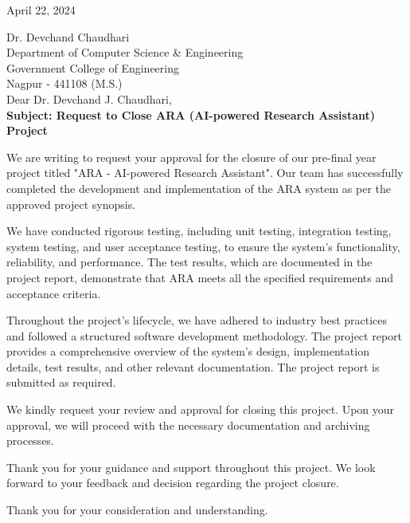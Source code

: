 \documentclass[a4paper]{report}
\date{April 22, 2024}
\begin{document}
\begin{FlushRight}
April 22, 2024
\end{FlushRight}

{Dr. Devchand Chaudhari\\Department of Computer Science \& Engineering\\Government College of Engineering\\Nagpur - 441108 (M.S.)}\\ \bigskip
{Dear Dr. Devchand J. Chaudhari,}\\
\medskip
\textbf{Subject: Request to Close ARA (AI-powered Research Assistant) Project}\\

\begin{justify}
We are writing to request your approval for the closure of our pre-final year project titled "ARA - AI-powered Research Assistant". Our team has successfully completed the development and implementation of the ARA system as per the approved project synopsis.

\medskip

\noindent We have conducted rigorous testing, including unit testing, integration testing, system testing, and user acceptance testing, to ensure the system's functionality, reliability, and performance. The test results, which are documented in the project report, demonstrate that ARA meets all the specified requirements and acceptance criteria.

\medskip

\noindent Throughout the project's lifecycle, we have adhered to industry best practices and followed a structured software development methodology. The project report provides a comprehensive overview of the system's design, implementation details, test results, and other relevant documentation. The project report is submitted as required.

\medskip

\noindent We kindly request your review and approval for closing this project. Upon your approval, we will proceed with the necessary documentation and archiving processes.

\medskip

\noindent Thank you for your guidance and support throughout this project. We look forward to your feedback and decision regarding the project closure.

\medskip
\noindent Thank you for your consideration and understanding.
\end{justify}
\bigskip
\end{document}
